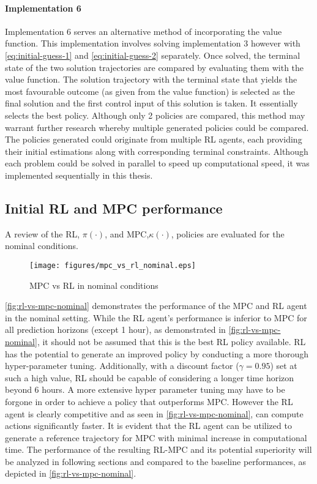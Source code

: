 \paragraph{Implementation 6}
Implementation 6 serves an alternative method of incorporating the value function. This implementation involves solving implementation 3 however with \autoref{eq:initial-guess-1} and \autoref{eq:initial-guess-2} separately. Once solved, the terminal state of the two solution trajectories are compared by evaluating them with the value function. The solution trajectory with the terminal state that yields the most favourable outcome (as given from the value function) is selected as the final solution and the first control input of this solution is taken. It essentially selects the best policy. Although only 2 policies are compared, this method may warrant further research whereby multiple generated policies could be compared. The policies generated could originate from multiple RL agents, each providing their initial estimations along with corresponding terminal constraints. Although each problem could be solved in parallel to speed up computational speed, it was implemented sequentially in this thesis.



\subsection{Initial RL and MPC performance}
A review of the RL, $\pi(\cdot)$, and MPC,$\kappa(\cdot)$, policies are evaluated for the nominal conditions.


\begin{figure}[H]
	\centering
	\texttt{[image: figures/mpc\_vs\_rl\_nominal.eps]}
	\caption{MPC vs RL in nominal conditions}
	\label{fig:rl-vs-mpc-nominal}
\end{figure}


\autoref{fig:rl-vs-mpc-nominal} demonstrates the performance of the MPC and RL agent in the nominal setting. While the RL agent's performance is inferior to MPC for all prediction horizons (except 1 hour), as demonstrated in \autoref{fig:rl-vs-mpc-nominal}, it should not be assumed that this is the best RL policy available. RL has the potential to generate an improved policy by conducting a more thorough hyper-parameter tuning. Additionally, with a discount factor ($\gamma = 0.95$) set at such a high value, RL should be capable of considering a longer time horizon beyond 6 hours. A more extensive hyper parameter tuning may have to be forgone in order to achieve a policy that outperforms MPC. However the RL agent is clearly competitive and as seen in \autoref{fig:rl-vs-mpc-nominal}, can compute actions significantly faster. It is evident that the RL agent can be utilized to generate a reference trajectory for MPC with minimal increase in computational time. The performance of the resulting RL-MPC and its potential superiority will be analyzed in following sections and compared to the baseline performances, as depicted in \autoref{fig:rl-vs-mpc-nominal}.

